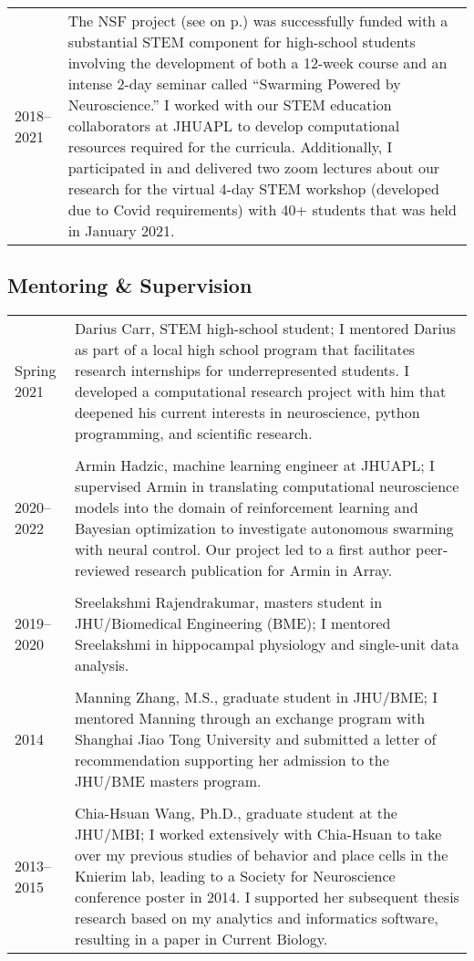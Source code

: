 \documentclass[10pt]{article}
\begin{document}
\begin{tabular}{@{\hspace{0.2in}}l>{\raggedright\arraybackslash}p{}}
  2018--2021 \hspace{0.1in} & The NSF project (see
  \emph{\nameref{sec:funding}} on p.\pageref{sec:funding}) was
  successfully funded with a substantial STEM component for high-school students
  involving the development of both a 12-week course and an intense 2-day
  seminar called ``Swarming Powered by Neuroscience.'' I worked with our STEM
  education collaborators at JHUAPL to develop computational resources required
  for the curricula. Additionally, I participated in and delivered two zoom
  lectures about our research for the virtual 4-day STEM workshop (developed due
  to Covid requirements) with 40+ students that was held in January 2021.
\end{tabular}

\subsection*{Mentoring \& Supervision}
\label{sec:mentoring}

\begin{tabular}{@{\hspace{0.2in}}l>{\raggedright\arraybackslash}p{}}
  Spring 2021 & Darius Carr, STEM high-school student; I mentored
  Darius as part of a local high school program that facilitates research
  internships for underrepresented students. I developed a computational
  research project with him that deepened his current interests in neuroscience,
  python programming, and scientific research. \\
  \tabularnewline
  2020--2022 \hspace{0.1in} & Armin Hadzic, machine learning engineer at JHUAPL;
  I supervised Armin in translating computational neuroscience models into the
  domain of reinforcement learning and Bayesian optimization to investigate
  autonomous swarming with neural control. Our project led to a first author
  peer-reviewed research publication for Armin in Array. \\
  \tabularnewline
  2019--2020 & Sreelakshmi Rajendrakumar, masters student in
  JHU/Biomedical Engineering (BME); I mentored Sreelakshmi in hippocampal
  physiology and single-unit data analysis. \\
  \tabularnewline
  2014 & Manning Zhang, M.S., graduate student in JHU/BME; I mentored Manning
  through an exchange program with Shanghai Jiao Tong University and submitted
  a letter of recommendation supporting her admission to the JHU/BME masters
  program. \\
  \tabularnewline
  2013--2015 & Chia-Hsuan Wang, Ph.D., graduate student at the JHU/MBI; I worked
  extensively with Chia-Hsuan to take over my previous studies of behavior
  and place cells in the Knierim lab, leading to a Society for Neuroscience
  conference poster in 2014. I supported her subsequent thesis research based
  on my analytics and informatics software, resulting in a paper in Current
  Biology. \\
\end{tabular}
\end{document}
